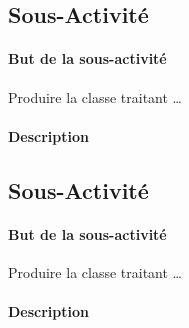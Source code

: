 

\subsection{Sous-Activit\'{e}} \label{act51}
\paragraph{But de la sous-activit\'{e}}
Produire la classe  traitant \ldots
\paragraph{Description}


\subsection{Sous-Activit\'{e}} \label{act52}
\paragraph{But de la sous-activit\'{e}}
Produire la classe  traitant \ldots
\paragraph{Description}
